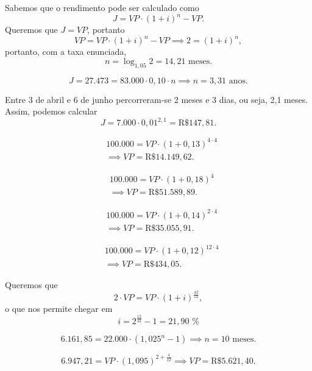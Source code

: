 \documentclass[a4paper]{report}
\begin{document}
Sabemos que o rendimento pode ser calculado como \[
    J = VP\cdot (1+i)^{n} - VP
.\] Queremos que $J = VP$, portanto  \[
VP = VP\cdot (1+i)^{n} - VP \implies 2 = \left( 1+i \right) ^{n}
,\] portanto, com a taxa enunciada, \[
n = \log_{1,05}2 = 14,21\text{ meses}
.\] 


\[
J = 27.473 = 83.000 \cdot 0,10 \cdot n \implies n = 3,31 \text{ anos}
.\] 


Entre 3 de abril e 6 de junho percorreram-se 2 meses e 3 dias, ou seja, 2,1 meses. Assim, podemos calcular \[
J = 7.000\cdot 0,01^{2,1} = \text{R\$ }147,81
.\] 



\begin{align*}
    & 100.000 = VP\cdot \left(1+0,13  \right) ^{4\cdot 4} \\
    & \implies VP = \text{R\$ }14.149,62
.\end{align*}


\begin{align*}
    & 100.000 = VP\cdot \left(1+0,18  \right) ^{4} \\
    & \implies VP = \text{R\$ }51.589,89
.\end{align*}


\begin{align*}
    & 100.000 = VP\cdot \left(1+0,14  \right) ^{2 \cdot 4} \\
    & \implies VP = \text{R\$ }35.055,91
.\end{align*}


\begin{align*}
    & 100.000 = VP\cdot \left(1+0,12  \right) ^{12 \cdot 4} \\
    & \implies VP = \text{R\$ }434,05
.\end{align*}


Queremos que \[
2\cdot VP = VP\cdot \left( 1 + i \right) ^{\frac{42}{12}}
,\] o que nos permite chegar em \[
i = 2^{\frac{12}{42}} - 1 = 21,90 \text{ \%}
\] 


\[
6.161,85 = 22.000 \cdot \left( 1,025 ^{n} - 1 \right)  \implies n = 10\text{ meses}
.\] 


\[
6.947,21 = VP \cdot \left( 1,095 \right) ^{2 + \frac{4}{12}} \implies VP = \text{R\$ }5.621,40
.\] 
\end{document}
